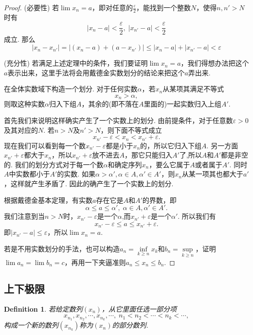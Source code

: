 \documentclass{article}
\newtheorem{definition}[theorem]{Definition}
\begin{document}
\begin{proof}
{\color{red} (必要性)} 若$\lim x_n = a$，即对任意的$\frac{\varepsilon}{2}$，能找到一个整数$N$，使得$n, n' > N$时有
$$
|x_n - a| < \frac{\varepsilon}{2},\; |x_{n'} - a| < \frac{\varepsilon}{2}
$$
成立. 那么
$$
|x_n - x_{n'}| = |(x_n -a ) + (a - x_{n'})| \leq |x_n-a| + |x_{n'}-a| < \varepsilon
$$

{\color{red} (充分性)} 若满足上述定理中的条件，{\color{blue}我们要证明$\lim x_n = a$，我们得想办法把这个$a$表示出来，这里手法将会用戴德金实数划分的结论来把这个$a$弄出来}.

在全体实数域下构造一个划分. 对于任何实数$\alpha$，若$x_n$从某项其满足不等式\[x_n > \alpha,\]则取这种实数$\alpha$归入下组$A$，其余的(即不落在$A$里面的)一起实数归入上组$A'$.

首先我们来说明这样确实产生了一个实数上的划分. 由前提条件，对于任意数$\varepsilon>0$及其对应的$N$. 若$n > N$及$n' > N$，则下面不等式成立\[x_{n'} - \varepsilon < x_n < x_{n'}+\varepsilon.\]现在我们可以看到每一个数$x_{n'} - \varepsilon$都是小于$x_n$的，所以它归入下组$A$. 另一方面$x_{n'}+\varepsilon$都大于$x_n$，所以$x_{n'}+\varepsilon$放不进去$A$，那它只能归入$A'$了,所以$A$和$A'$都是非空的. 我们的划分方式对于每一个数$\alpha$和确定序列$x_n$，要么它属于$A$或者属于$A'$. 同时$A$中实数都小于$A'$的实数. 如果$\alpha > \alpha', \alpha \in A , \alpha' \in A'$，则$x_n$从某一项其也都大于$a'$，这样就产生矛盾了. 因此的确产生了一个实数上的划分.

根据戴德金基本定理，有实数$a$存在它是$A$和$A'$的界数，即\[\alpha \leq a \leq \alpha', \; \alpha \in A,\alpha' \in A'.\]我们注意到当$n > N$时，$x_{n'} - \varepsilon$是一个$\alpha$,而$x_{n'} +\varepsilon$是一个$\alpha'$. 所以我们有\[x_{n'} - \varepsilon \leq a \leq x_{n'} + \varepsilon.\]即$|x_{n'}-a| \leq \varepsilon$，所以$\lim x_n = a$.

{\color{blue} 若是不用实数划分的手法，也可以构造$a_n = \inf\limits_{k \geq n} x_k$和$b_n=\sup\limits_{k \geq n}$，证明$\lim a_n = \lim b_n = c$，再用一下夹逼准则$a_n \leq x_n \leq b_n$.}
\end{proof}

\subsection{上下极限}

\begin{definition}
\rm 若给定数列$(x_n)$，从它里面任选一部分项
$$
x_{n_1},x_{n_2},\cdots,x_{n_k},\cdots,\; n_1 < n_2 < \cdots < n_k < \cdots,
$$
构成一个新的数列$(x_{n_k})$称为$(x_n)$的部分数列.
\end{definition}
\end{document}
